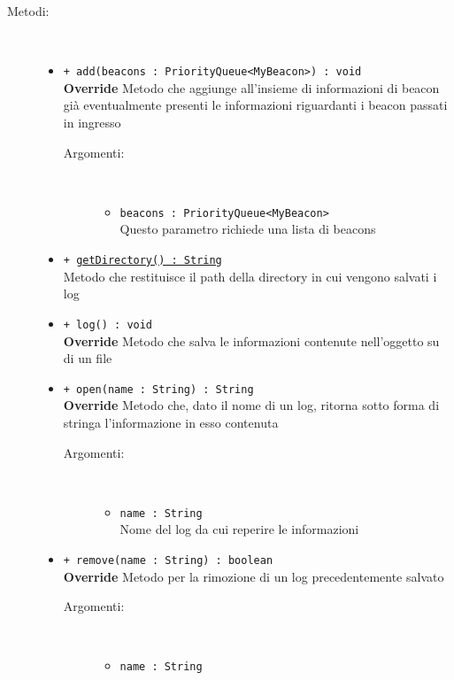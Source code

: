 \documentclass[../DefinizioneDiProdotto.tex]{subfiles}
\begin{document}
\begin{description}
\begin{itemize}
	\end{itemize}
	\item[Metodi:] \
	\begin{itemize}
		\item \texttt{+ add(beacons : PriorityQueue<MyBeacon>) : void}\\
		\textbf{Override} Metodo che aggiunge all'insieme di informazioni di beacon già eventualmente presenti le informazioni riguardanti i beacon passati in ingresso
		\begin{description}
			\item[Argomenti:] \
			\begin{itemize}
				\item \texttt{beacons : PriorityQueue<MyBeacon>}\\
				Questo parametro richiede una lista di beacons\end{itemize}
		\end{description}
		\item \texttt{+ \underline{getDirectory() : String}}\\
		Metodo che restituisce il path della directory in cui vengono salvati i log
		\item \texttt{+ log() : void}\\
		\textbf{Override} Metodo che salva le informazioni contenute nell'oggetto su di un file
		\item \texttt{+ open(name : String) : String}\\
		\textbf{Override} Metodo che, dato il nome di un log, ritorna sotto forma di stringa l'informazione in esso contenuta
		\begin{description}
			\item[Argomenti:] \
			\begin{itemize}
				\item \texttt{name : String}\\
				Nome del log da cui reperire le informazioni\end{itemize}
		\end{description}
		\item \texttt{+ remove(name : String) : boolean}\\
		\textbf{Override} Metodo per la rimozione di un log precedentemente salvato
		\begin{description}
			\item[Argomenti:] \
			\begin{itemize}
				\item \texttt{name : String}\\

\end{itemize}
\end{description}
\end{itemize}
\end{description}
\end{document}
